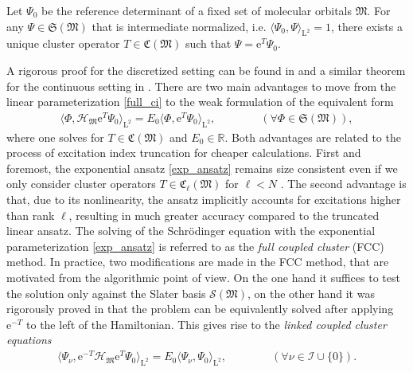 \documentclass[reqno]{amsart}
\begin{document}
\begin{theorem}\label{CC_works}
    Let $\Psi_0$ be the reference determinant of a fixed set of molecular orbitals $\mathfrak{M}$. For any $\Psi \in \mathfrak{S}(\mathfrak{M})$ that is intermediate normalized, i.e. $\langle \Psi_0,\Psi\rangle_{\mathrm{L}^2}=1$, there exists a unique cluster operator $T\in \mathfrak{C}(\mathfrak{M})$ such that $\Psi=\mathrm{e}^T\Psi_0$.
\end{theorem}
A rigorous proof for the discretized setting can be found in \cite{Schneider2009} and a similar theorem for the continuous setting in \cite{rohwedder1}. There are two main advantages to move from the linear parameterization \eqref{full_ci} to the weak formulation of the equivalent form
\begin{align}\label{exp_ansatz}
    \langle \Phi, \mathcal{H}_\mathfrak{M}\mathrm{e}^T\Psi_0\rangle_{\mathrm{L}^2}=E_0 \langle \Phi,\mathrm{e}^T\Psi_0\rangle_{\mathrm{L}^2},\qquad\qquad(\forall \Phi \in \mathfrak{S}(\mathfrak{M})),
\end{align}
where one solves for $T\in \mathfrak{C}(\mathfrak{M})$ and $E_0\in \mathbb{R}$. Both advantages are related to the process of excitation index truncation for cheaper calculations. First and foremost, the exponential ansatz \eqref{exp_ansatz} remains size consistent even if we only consider cluster operators $T\in \mathfrak{C}_\ell(\mathfrak{M})$ for $\ell<N$ \cite{helgakar, Schneider2009}. The second advantage is that, due to its nonlinearity, the ansatz implicitly accounts for excitations higher than rank $\ell$, resulting in much greater accuracy compared to the truncated linear ansatz. The solving of the Schrödinger equation with the exponential parameterization \eqref{exp_ansatz} is referred to as the \textit{full coupled cluster} (FCC) method. In practice, two modifications are made in the FCC method, that are motivated from the algorithmic point of view. On the one hand it suffices to test the solution only against the Slater basis $\mathcal{S}(\mathfrak{M})$, on the other hand it was rigorously proved in \cite{Schneider2009} that the problem can be equivalently solved after applying $\mathrm{e}^{-T}$ to the left of the Hamiltonian. This gives rise to the \textit{linked coupled cluster equations}
\begin{align}\label{linked_FFC}
    \langle \Psi_\nu, \mathrm{e}^{-T}\mathcal{H}_\mathfrak{M}\mathrm{e}^T\Psi_0\rangle_{\mathrm{L}^2}=E_0\langle\Psi_\nu,\Psi_0 \rangle_{\mathrm{L}^2},\qquad\qquad(\forall \nu\in \mathscr{I}\cup\lbrace0\rbrace).
\end{align}
\end{document}
